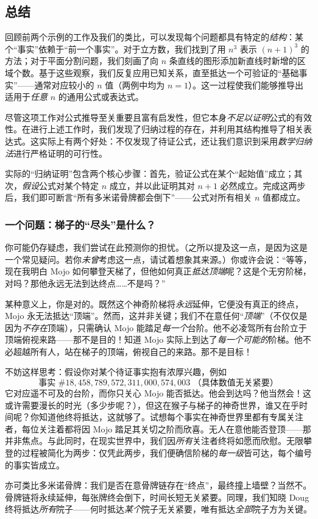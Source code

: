 \subsection{总结}

回顾前两个示例的工作及我们的类比，可以发现每个问题都具有特定的\emph{结构}：某个``事实''依赖于``前一个事实''。对于立方数，我们找到了用 $n^3$ 表示 $(n + 1)^3$ 的方法；对于平面分割问题，我们刻画了向 $n$ 条直线的图形添加新直线时新增的区域个数。基于这些观察，我们反复应用已知关系，直至抵达一个可验证的``基础事实''——通常对应较小的 $n$ 值（两例中均为 $n = 1$）。这一过程使我们能够推导出适用于\emph{任意} $n$ 的通用公式或表达式。

尽管这项工作对公式推导至关重要且富有启发性，但它本身\emph{不足以证明}公式的有效性。在进行上述工作时，我们发现了归纳过程的存在，并利用其结构推导了相关表达式。这实际上有两个好处：不仅发现了待证公式，还让我们意识到采用\emph{数学归纳法}进行严格证明的可行性。

实际的``归纳证明''包含两个核心步骤：首先，验证公式在某个``起始值''成立；其次，\emph{假设}公式对某个特定 $n$ 成立，并以此证明其对 $n + 1$ 必然成立。完成这两步后，我们即可断言``所有多米诺骨牌都会倒下''——公式对所有相关 $n$ 值都成立。

\subsubsection*{一个问题：梯子的``尽头''是什么？}

你可能仍存疑虑，我们尝试在此预测你的担忧。（之所以提及这一点，是因为这是一个常见疑问。若你\emph{未曾}考虑这一点，请试着想象其来源。）你或许会说：``等等，现在我明白 Mojo 如何攀登天梯了，但他如何真正\emph{抵达顶端}呢？这是个无穷阶梯，对吗？那他永远无法到达终点……不是吗？''

某种意义上，你是对的。既然这个神奇阶梯将\emph{永远}延伸，它便没有真正的终点，Mojo 永无法抵达``顶端''。然而，这并非关键；我们不在意任何``\emph{顶端}''（不仅仅是因为\emph{不存在}顶端），只需确认 Mojo 能踏足\emph{每一个}台阶。他不必凌驾所有台阶立于顶端俯视来路——那不是目的！知道 Mojo 实际上到达了\emph{每一个可能的}阶梯。他不必超越所有人，站在梯子的顶端，俯视自己的来路。那不是目标！

不妨这样思考：假设你对某个待证事实抱有浓厚兴趣，例如
\[\text{事实\ } \#18,458,789,572,311,000,574,003 \text{\ （具体数值无关紧要）}\]
它对应遥不可及的台阶，而你只关心 Mojo 能否抵达。他会到达吗？他当然会！这或许需要漫长的时光（多少步呢？），但这在猴子与梯子的神奇世界，谁又在乎时间呢？你知道他终将抵达，这就够了。试想每个事实在神奇世界里都有专属关注者，每位关注着都将因 Mojo 踏足其关切之阶而欣喜。无人在意他能否登顶——那并非焦点。与此同时，在现实世界中，我们因\emph{所有}关注者终将如愿而欣慰。无限攀登的过程被简化为两步：仅凭此两步，我们便确信阶梯的\emph{每一级}皆可达，每个编号的事实皆成立。

亦可类比多米诺骨牌：我们是否在意骨牌链存在``终点''，最终撞上墙壁？当然不。骨牌链将永续延伸，每张牌终会倒下，时间长短无关紧要。同理，我们知晓 Doug 终将抵达\emph{所有}院子——何时抵达\emph{某个}院子无关紧要，唯有抵达\emph{全部}院子方为关键。
